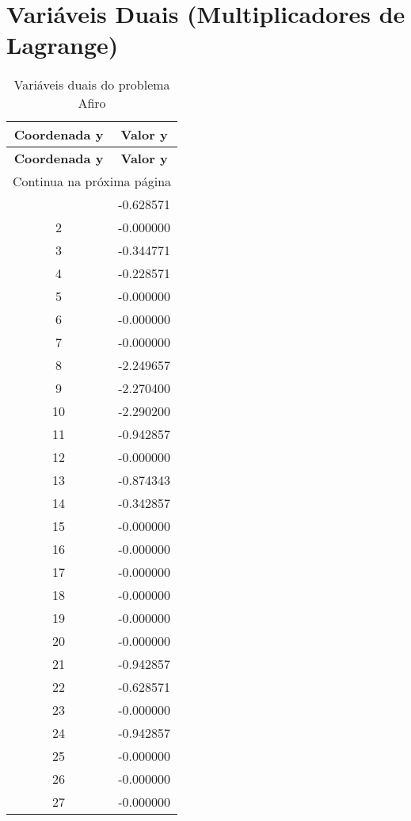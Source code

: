 \documentclass[12pt]{article}
\begin{document}
\section{Variáveis Duais (Multiplicadores de Lagrange)}

\begin{longtable}{@{}cc@{}}
\caption{Variáveis duais do problema Afiro} \\
\toprule
\textbf{Coordenada y} & \textbf{Valor y} \\
\midrule
\endfirsthead

\toprule
\textbf{Coordenada y} & \textbf{Valor y} \\
\midrule
\endhead

\midrule \multicolumn{2}{r}{{Continua na próxima página}} \\ \midrule
\endfoot

\bottomrule
\endlastfoot
1 & -0.628571 \\
2 & -0.000000 \\
3 & -0.344771 \\
4 & -0.228571 \\
5 & -0.000000 \\
6 & -0.000000 \\
7 & -0.000000 \\
8 & -2.249657 \\
9 & -2.270400 \\
10 & -2.290200 \\
11 & -0.942857 \\
12 & -0.000000 \\
13 & -0.874343 \\
14 & -0.342857 \\
15 & -0.000000 \\
16 & -0.000000 \\
17 & -0.000000 \\
18 & -0.000000 \\
19 & -0.000000 \\
20 & -0.000000 \\
21 & -0.942857 \\
22 & -0.628571 \\
23 & -0.000000 \\
24 & -0.942857 \\
25 & -0.000000 \\
26 & -0.000000 \\
27 & -0.000000 \\

\end{longtable}
\end{document}
